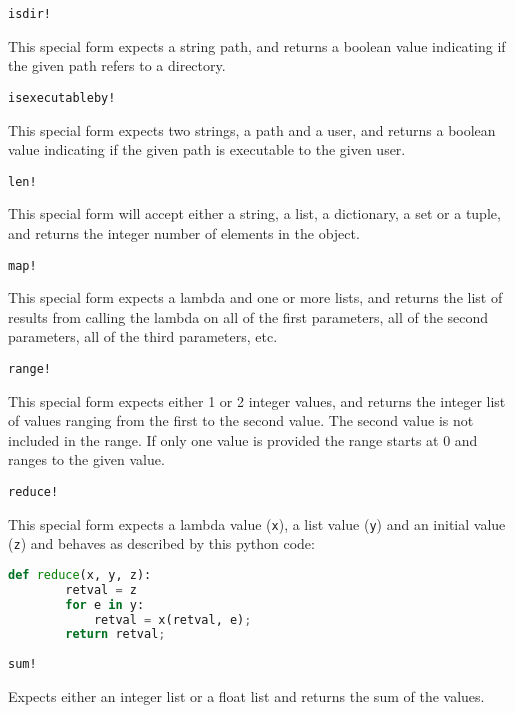 {\begin{itemize}
{		\item[] \texttt{isdir!}
		
			This special form expects a string path, and returns
			a boolean value indicating if the given path refers to a
			directory.
		
		\item[] \texttt{isexecutableby!}
		
			This special form expects two strings, a path and a user, and
			returns a boolean value indicating if the given path is
			executable to the given user.
		
		\item[] \texttt{len!}
			
			This special form will accept either a string, a list, a dictionary,
			a set or a tuple, and returns the integer number of elements in
			the object.
		
		\item[] \texttt{map!}
		
			This special form expects a lambda and one or more lists,
			and returns the list of results from calling the lambda on all
			of the first parameters, all of the second parameters, all of the
			third parameters, etc.
		
		\item[] \texttt{range!}
		
			This special form expects either 1 or 2 integer values,
			and returns the integer list of values ranging from the first to
			the second value. The second value is not included in the range.
			If only one value is provided the range starts at 0 and ranges
			to the given value.
		
		\item[] \texttt{reduce!}
		
			This special form expects a lambda value (\texttt{x}),
			a list value (\texttt{y}) and an initial value (\texttt{z})
			and behaves as described by this python code:
\begin{lstlisting}[language=Python]
	def reduce(x, y, z):
		retval = z
		for e in y:
			retval = x(retval, e);
		return retval;
\end{lstlisting}
		
		\item[] \texttt{sum!}
		
			Expects either an integer list or a float list and returns
			the sum of the values.
	}
	\end{itemize}
	
}











